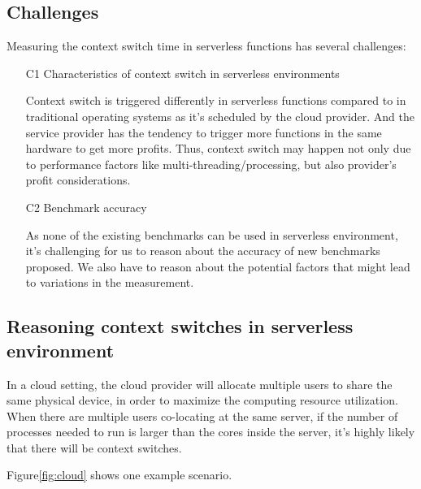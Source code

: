 


\subsection{Challenges}
Measuring the context switch time in serverless functions has several challenges:
\begin{itemize}
	\item [C1] Characteristics of context switch in serverless environments
	
	Context switch is triggered differently in serverless functions compared to in traditional operating systems as it's scheduled by the cloud provider.
	And the service provider has the tendency to trigger more functions in the same hardware to get more profits. 
	Thus, context switch may happen not only due to performance factors like multi-threading/processing, but also provider's profit considerations.
	
	\item [C2] Benchmark accuracy
	
	As none of the existing benchmarks can be used in serverless environment, 
	it's challenging for us to reason about the accuracy of new benchmarks proposed.
	We also have to reason about the potential factors that might lead to variations in the measurement.
\end{itemize}

\subsection{Reasoning context switches in serverless environment}
	In a cloud setting, the cloud provider will allocate multiple users to share the same physical device, in order to maximize the computing resource utilization.
	When there are multiple users co-locating at the same server, if the number of processes needed to run is larger than the cores inside the server, it's highly likely that there will be context switches. 
	
	Figure\ref{fig:cloud} shows one example scenario. 
	
	







